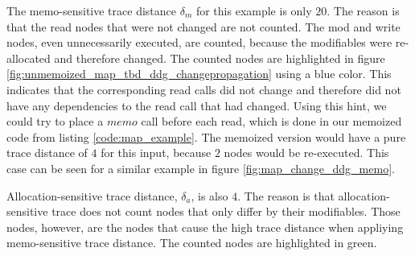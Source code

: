 The memo-sensitive trace distance $\delta_m$ for this example is only $20$. The reason is that the read nodes that were not changed are not counted. The mod and write nodes, even unnecessarily executed, are counted, because the modifiables were re-allocated and therefore changed. The counted nodes are highlighted in figure \ref{fig:unmemoized_map_tbd_ddg_changepropagation} using a blue color. This indicates that the corresponding read calls did not change and therefore did not have any dependencies to the read call that had changed. Using this hint, we could try to place a $memo$ call before each read, which is  done in our memoized code from listing \ref{code:map_example}. The memoized version would have a pure trace distance of $4$ for this input, because $2$ nodes would be re-executed. This case can be seen for a similar example in figure \ref{fig:map_change_ddg_memo}. 

Allocation-sensitive trace distance, $\delta_a$, is also $4$. The reason is that allocation-sensitive trace does not count nodes that only differ by their modifiables. Those nodes, however, are the nodes that cause the high trace distance when appliying memo-sensitive trace distance. The counted nodes are highlighted in green.  

